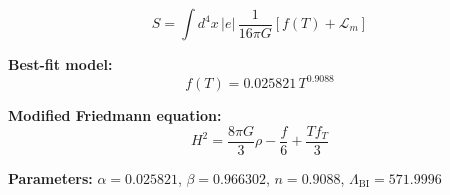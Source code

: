 
\begin{equation}
  S = \int d^4x \, |e| \, \frac{1}{16\pi G} \left[ f(T) + \mathcal{L}_m \right]
\end{equation}

\textbf{Best-fit model:}
\begin{equation}
  f(T) = 0.025821 \, T^{0.9088}
\end{equation}

\textbf{Modified Friedmann equation:}
\begin{equation}
  H^2 = \frac{8\pi G}{3} \rho - \frac{f}{6} + \frac{T f_T}{3}
\end{equation}

\textbf{Parameters:}
$\alpha = 0.025821$, \quad
$\beta = 0.966302$, \quad
$n = 0.9088$, \quad
$\Lambda_{\text{BI}} = 571.9996$